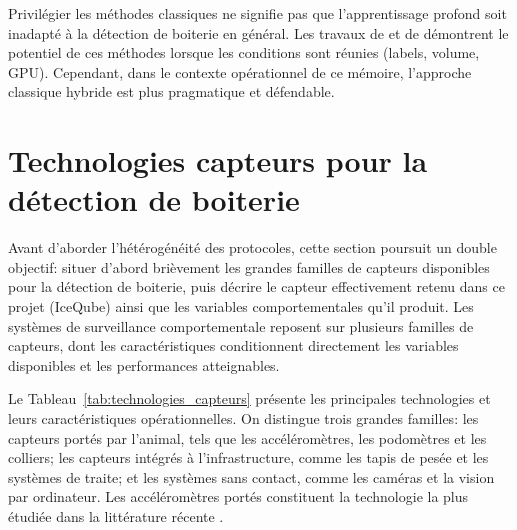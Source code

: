 Privilégier les méthodes classiques ne signifie pas que l'apprentissage profond soit
inadapté à la détection de boiterie en général. Les travaux de \cite{balasso2023behaviour}
et de \cite{qiao2021review} démontrent le potentiel de ces méthodes lorsque les conditions
sont réunies (labels, volume, GPU). Cependant, dans le
contexte opérationnel de ce mémoire, l'approche classique hybride est plus pragmatique et
défendable.

\section{Technologies capteurs pour la détection de boiterie}
\label{sec:technologies_capteurs}

Avant d'aborder l'hétérogénéité des protocoles, cette section poursuit un double objectif:
situer d'abord brièvement les grandes familles de capteurs disponibles pour la détection
de boiterie, puis décrire le capteur effectivement retenu dans ce projet (IceQube) ainsi
que les variables comportementales qu'il produit. Les systèmes de surveillance
comportementale reposent sur plusieurs familles de capteurs, dont les caractéristiques
conditionnent directement les variables disponibles et les performances atteignables.

Le Tableau~\ref{tab:technologies_capteurs} présente les principales technologies et leurs
caractéristiques opérationnelles. On distingue trois grandes familles: les capteurs portés
par l'animal, tels que les accéléromètres, les podomètres et les colliers; les capteurs
intégrés à l'infrastructure, comme les tapis de pesée et les systèmes de traite; et les
systèmes sans contact, comme les caméras et la vision par ordinateur. Les accéléromètres
portés constituent la technologie la plus étudiée dans la littérature récente
\citep{oleary2020accelerometers,alsaaod2019automatic}.

